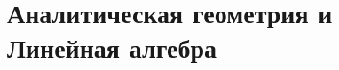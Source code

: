 \section{Аналитическая геометрия и Линейная алгебра}

\newpage

\newpage

\newpage

\newpage

\newpage